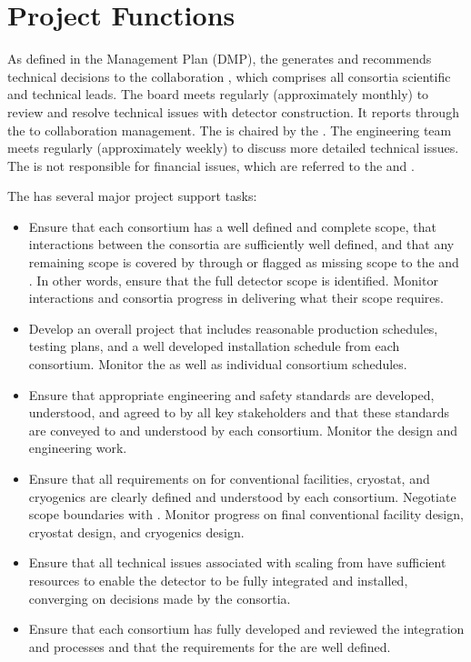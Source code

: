 \chapter{Project Functions}
\label{vl:tc-project}

As defined in the  Management Plan (DMP), the 
 generates and recommends technical decisions to the
 collaboration , which comprises all consortia
scientific and technical leads. The board meets regularly
(approximately monthly) to review and resolve technical issues with
detector construction. It reports through the  to
collaboration management. The   is chaired by
the  . The   engineering team meets regularly
(approximately weekly) to discuss more detailed technical issues. The
 is not responsible for financial issues, which are referred
to the  and .

The  has several major project support tasks:
\begin{itemize}
\item Ensure that each consortium has a well defined and complete
  scope, that interactions between the consortia are sufficiently well
  defined, and that any remaining scope is covered by 
  through  or flagged as missing scope to the
   and . In other words, ensure that the full
  detector scope is identified. Monitor interactions and consortia
  progress in delivering what their scope requires.
\item Develop an overall project 
  that includes reasonable production schedules, testing plans, and a
  well developed installation schedule from each consortium. Monitor
  the  as well as individual consortium schedules.
\item Ensure that appropriate engineering and safety standards are
  developed, understood, and agreed to by all key stakeholders and that these
  standards are conveyed to and understood by each
  consortium. Monitor the design and engineering work.
\item Ensure that all  requirements on  for
  conventional facilities, cryostat, and cryogenics are clearly
  defined and understood by each consortium. Negotiate scope
  boundaries with . Monitor  progress on
  final conventional facility design, cryostat design, and cryogenics
  design.
\item Ensure that all technical issues associated with scaling from
   have sufficient resources to enable the detector to be fully integrated and
  installed, converging on
  decisions made by the consortia.
\item Ensure that each consortium has fully developed and reviewed the integration and  processes and that the requirements for the  are well defined.
\end{itemize}

